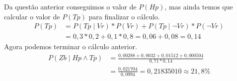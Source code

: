 \documentclass{article}
\begin{document}
\begin{enumerate}
        Da questão anterior conseguimos o valor de $P(Hp)$, mas ainda temos que calcular o valor de $P(Tp)$ para finalizar o cálculo.
        \begin{align*}
            P(Tp) &= P(Tp \mid Vr) * P(Vr) + P(Tp \mid \neg Vr) * P(\neg Vr) \\
                  &= 0,3 * 0,2 + 0,1 * 0,8  = 0,06 + 0,08 = 0,14
        \end{align*}
        Agora podemos terminar o cálculo anterior.
        \begin{align*}
            P(Zb \mid Hp \land Tp) &= \frac{0,00288+0,0032+0,01512+0,000504}{0,71*0,14}\\
                                   &= \frac{0,021704}{0,0994} = 0,21835010 \approx 21,8\%
        \end{align*}
    
\end{enumerate}
\end{document}
